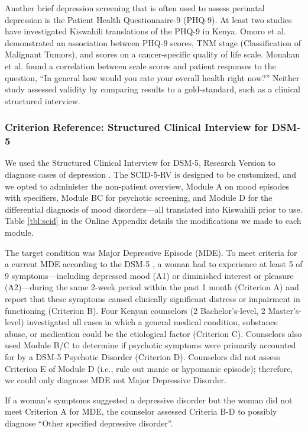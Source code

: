 \documentclass[man,natbib,longtable]{apa6}\usepackage[]{graphicx}\usepackage[]{color}
\begin{document}
Another brief depression screening that is often used to assess perinatal depression is the Patient Health Questionnaire-9 (PHQ-9). At least two studies have investigated Kiswahili translations of the PHQ-9 in Kenya. Omoro et al. \citeyear{Omoro:2006} demonstrated an association between PHQ-9 scores, TNM stage (Classification of Malignant Tumors), and scores on a cancer-specific quality of life scale. Monahan et al. \citeyear{Monahan:2009} found a correlation between scale scores and patient responses to the question, ``In general how would you rate your overall health right now?'' Neither study assessed validity by comparing results to a gold-standard, such as a clinical structured interview.

\subsubsection{Criterion Reference: Structured Clinical Interview for DSM-5}

We used the Structured Clinical Interview for DSM-5, Research Version to diagnose cases of depression \citep[SCID-5-RV;][]{First:2015}. The SCID-5-RV is designed to be customized, and we opted to administer the non-patient overview, Module A on mood episodes with specifiers, Module BC for psychotic screening, and Module D for the differential diagnosis of mood disorders---all translated into Kiswahili prior to use. Table \ref{tbl:scid} in the Online Appendix details the modifications we made to each module. 

The target condition was Major Depressive Episode (MDE). To meet criteria for a current MDE according to the DSM-5 \citep{APA:2013}, a woman had to experience at least 5 of 9 symptoms---including depressed mood (A1) or diminished interest or pleasure (A2)---during the same 2-week period within the past 1 month (Criterion A) and report that these symptoms caused clinically significant distress or impairment in functioning (Criterion B). Four Kenyan counselors (2 Bachelor’s-level, 2 Master’s-level) investigated all cases in which a general medical condition, substance abuse, or medication could be the etiological factor (Criterion C). Counselors also used Module B/C to determine if psychotic symptoms were primarily accounted for by a DSM-5 Psychotic Disorder (Criterion D). Counselors did not assess Criterion E of Module D (i.e., rule out manic or hypomanic episode); therefore, we could only diagnose MDE not Major Depressive Disorder.

If a woman's symptoms suggested a depressive disorder but the woman did not meet Criterion A for MDE, the counselor assessed Criteria B-D to possibly diagnose ``Other specified depressive disorder''.
\end{document}
